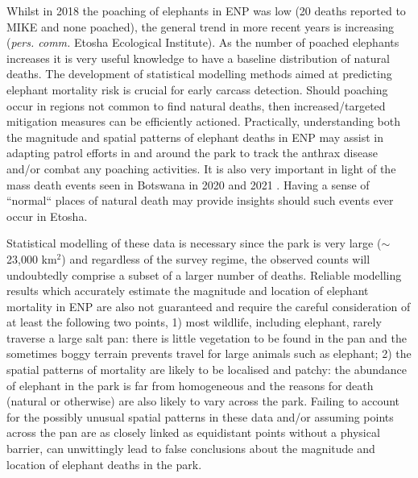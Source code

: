 \documentclass[letterpaper]{interact}
\begin{document}
Whilst in 2018 the poaching of elephants in ENP was low (20 deaths reported to MIKE and none poached), the general trend in more recent years is increasing (\textit{pers. comm.} Etosha Ecological Institute). As the number of poached elephants increases it is very useful knowledge to have a baseline distribution of natural deaths.  The development of statistical modelling methods aimed at predicting elephant mortality risk is crucial for early carcass detection. Should poaching occur in regions not common to find natural deaths, then increased/targeted mitigation measures can be efficiently actioned. Practically, understanding both the magnitude and spatial patterns of elephant deaths in ENP may assist in adapting patrol efforts in and around the park to track the anthrax disease and/or combat any poaching activities. It is also very important in light of the mass death events seen in Botswana in 2020 and 2021 \cite{Karombo2021}. Having a sense of ``normal`` places of natural death may provide insights should such events ever occur in Etosha.

Statistical modelling of these data is necessary since the park is very large ($\sim$23,000 km\(^2\)) and regardless of the survey regime, the observed counts will undoubtedly comprise a subset of a larger number of deaths. Reliable modelling results which accurately estimate the magnitude and location of elephant mortality in ENP are also not guaranteed and require the careful consideration of at least the following two points, 1) most wildlife, including elephant, rarely traverse a large salt pan: there is little vegetation to be found in the pan and the sometimes boggy terrain prevents travel for large animals such as elephant; 2) the spatial patterns of mortality are likely to be localised and patchy: the abundance of elephant in the park is far from homogeneous and the reasons for death (natural or otherwise) are also likely to vary across the park. Failing to account for the possibly unusual spatial patterns in these data and/or assuming points across the pan are as closely linked as equidistant points without a physical barrier, can unwittingly lead to false conclusions about the magnitude and location of elephant deaths in the park.
\end{document}
